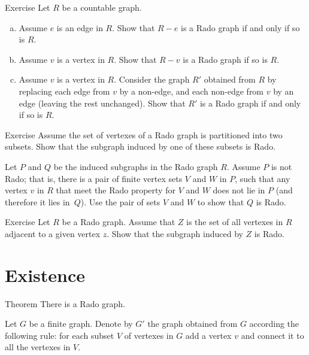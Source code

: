 \begin{thm}{Exercise}
Let $R$ be a countable graph. 
\begin{enumerate}[(a)]
 \item Assume  $e$ is an edge in $R$. 
 Show that $R-e$ is a Rado graph if and only if so is $R$.
 
 \item Assume $v$ is a vertex in $R$. 
 Show that $R-v$ is a Rado graph if so is $R$.
 
 \item Assume $v$ is a vertex in $R$. 
 Consider the graph $R'$ obtained from $R$ by replacing each edge from $v$ by a non-edge, and each non-edge from $v$ by an edge (leaving the rest unchanged).
 Show that $R'$ is a Rado graph if and only if so is $R$. 
\end{enumerate}

\end{thm}

\begin{thm}{Exercise}
Assume the set of vertexes of a Rado graph is partitioned into two subsets.
Show that the subgraph induced by one of these subsets is Rado.
\end{thm}

 Let $P$ and $Q$ be the induced subgraphs in the Rado graph $R$.
Assume $P$ is not Rado; that is, there is a pair of finite vertex sets $V$ and $W$ in $P$, such that any vertex $v$ in $R$ that meet the Rado property for $V$ and $W$ does not lie in $P$ (and therefore it lies in~$Q$).
Use the pair of sets $V$ and $W$ to show that $Q$ is Rado.

\begin{thm}{Exercise}
Let $R$ be a Rado graph.
Assume that $Z$ is the set of all vertexes in $R$ adjacent to a given vertex $z$.
Show that the subgraph induced by $Z$ is Rado.
\end{thm}


\section*{Existence}

\begin{thm}{Theorem}
There is a Rado graph.
\end{thm}

Let $G$ be a finite graph.
Denote by $G'$ the graph obtained from $G$ according the following rule:
for each subset $V$ of vertexes in $G$ add a vertex $v$ and connect it to all the vertexes in $V$.

